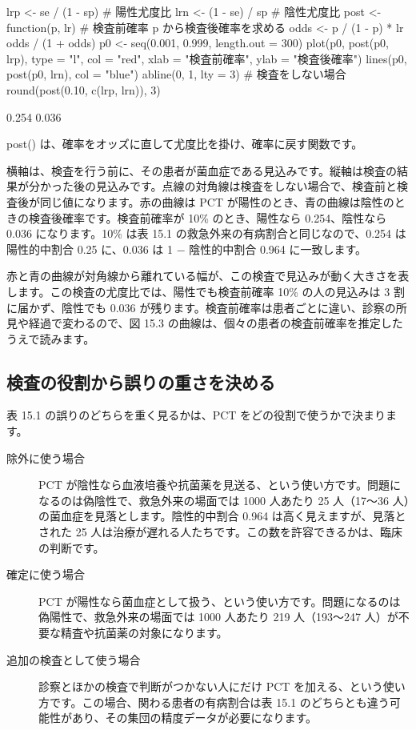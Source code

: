 
\begin{rcode}
lrp <- se / (1 - sp)         # 陽性尤度比
lrn <- (1 - se) / sp         # 陰性尤度比
post <- function(p, lr) {    # 検査前確率 p から検査後確率を求める
  odds <- p / (1 - p) * lr
  odds / (1 + odds)
}
p0 <- seq(0.001, 0.999, length.out = 300)
plot(p0, post(p0, lrp), type = "l", col = "red",
     xlab = "検査前確率", ylab = "検査後確率")
lines(p0, post(p0, lrn), col = "blue")
abline(0, 1, lty = 3)        # 検査をしない場合
round(post(0.10, c(lrp, lrn)), 3)
\end{rcode}

\begin{rout}
[1] 0.254 0.036
\end{rout}

post() は、確率をオッズに直して尤度比を掛け、確率に戻す関数です。

横軸は、検査を行う前に、その患者が菌血症である見込みです。縦軸は検査の結果が分かった後の見込みです。点線の対角線は検査をしない場合で、検査前と検査後が同じ値になります。赤の曲線は PCT が陽性のとき、青の曲線は陰性のときの検査後確率です。検査前確率が 10\% のとき、陽性なら 0.254、陰性なら 0.036 になります。10\% は表 15.1 の救急外来の有病割合と同じなので、0.254 は陽性的中割合 0.25 に、0.036 は 1 − 陰性的中割合 0.964 に一致します。

赤と青の曲線が対角線から離れている幅が、この検査で見込みが動く大きさを表します。この検査の尤度比では、陽性でも検査前確率 10\% の人の見込みは 3 割に届かず、陰性でも 0.036 が残ります。検査前確率は患者ごとに違い、診察の所見や経過で変わるので、図 15.3 の曲線は、個々の患者の検査前確率を推定したうえで読みます。

\subsection{検査の役割から誤りの重さを決める}
\label{sec:15-1-4}

表 15.1 の誤りのどちらを重く見るかは、PCT をどの役割で使うかで決まります。

\begin{description}
\item[除外に使う場合] PCT が陰性なら血液培養や抗菌薬を見送る、という使い方です。問題になるのは偽陰性で、救急外来の場面では 1000 人あたり 25 人（17〜36 人）の菌血症を見落とします。陰性的中割合 0.964 は高く見えますが、見落とされた 25 人は治療が遅れる人たちです。この数を許容できるかは、臨床の判断です。
\item[確定に使う場合] PCT が陽性なら菌血症として扱う、という使い方です。問題になるのは偽陽性で、救急外来の場面では 1000 人あたり 219 人（193〜247 人）が不要な精査や抗菌薬の対象になります。
\item[追加の検査として使う場合] 診察とほかの検査で判断がつかない人にだけ PCT を加える、という使い方です。この場合、関わる患者の有病割合は表 15.1 のどちらとも違う可能性があり、その集団の精度データが必要になります。
\end{description}

